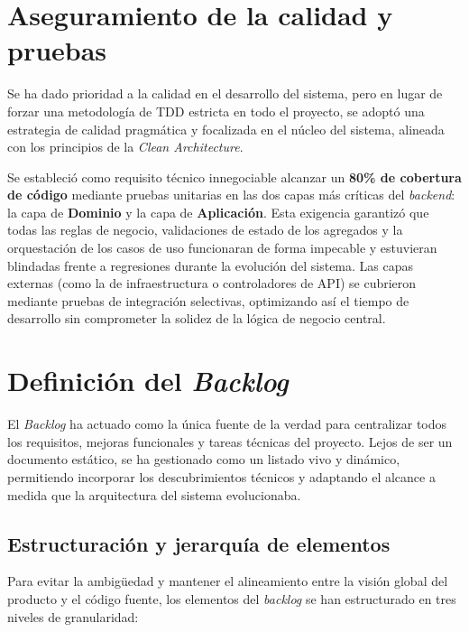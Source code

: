 \section{Aseguramiento de la calidad y pruebas}
Se ha dado prioridad a la calidad en el desarrollo del sistema, pero en lugar de forzar una metodología de \ac{TDD} estricta en todo el proyecto, se adoptó una estrategia de calidad pragmática y focalizada en el núcleo del sistema, alineada con los principios de la \emph{Clean Architecture}.

Se estableció como requisito técnico innegociable alcanzar un \textbf{80\% de cobertura de código} mediante pruebas unitarias en las dos capas más críticas del \emph{backend}: la capa de \textbf{Dominio} y la capa de \textbf{Aplicación}. 
Esta exigencia garantizó que todas las reglas de negocio, validaciones de estado de los agregados y la orquestación de los casos de uso funcionaran de forma impecable y estuvieran blindadas frente a regresiones durante la evolución del sistema. Las capas externas (como la de infraestructura o controladores de \ac{API}) se cubrieron mediante pruebas de integración selectivas, optimizando así el tiempo de desarrollo sin comprometer la solidez de la lógica de negocio central.

\section{Definición del \emph{Backlog}}

El \emph{Backlog} ha actuado como la única fuente de la verdad para centralizar todos los requisitos, mejoras funcionales y tareas técnicas del proyecto. Lejos de ser un documento estático, se ha gestionado como un listado vivo y dinámico, permitiendo incorporar los descubrimientos técnicos y adaptando el alcance a medida que la arquitectura del sistema evolucionaba.

\subsection{Estructuración y jerarquía de elementos}
Para evitar la ambigüedad y mantener el alineamiento entre la visión global del producto y el código fuente, los elementos del \emph{backlog} se han estructurado en tres niveles de granularidad:

